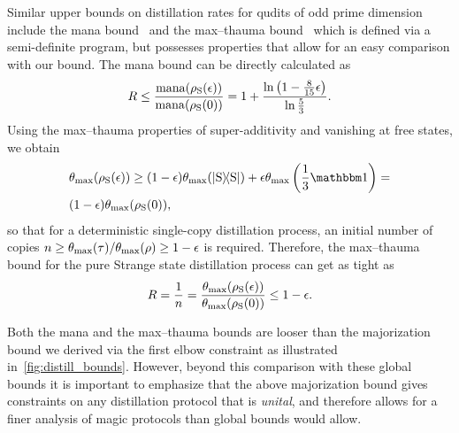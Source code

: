 \documentclass[pra,
aps,
twocolumn,
superscriptaddress,
groupedaddress,
nofootinbib,
reprint
]{revtex4-1}
\begin{document}
Similar upper bounds on distillation rates for qudits of odd prime dimension include the mana bound~\cite{cit:veitch} and the max--thauma bound~\cite{Wang_2020} which is defined via a semi-definite program, but possesses properties that allow for an easy comparison with our bound.
The mana bound can be directly calculated as
\begin{equation}
	R \leq \frac{{{\rm{mana}}(\rho_{\rm{S}}(\epsilon))}}{{{\rm{mana}}(\rho_{\rm{S}}(0))}} = 1 + \frac{\ln \left(1 - \frac{8}{15}\epsilon \right)}{\ln \frac{5}{3}}.
\end{equation}
Using the max--thauma properties of super-additivity and vanishing at free states, we obtain
\begin{align}
	&\theta_{\rm{max}}(\rho_{\rm{S}}(\epsilon)) \geq (1-\epsilon) \theta_{\rm{max}}(\ketbra{\rm{S}}) + \epsilon \theta_{\rm{max}}\left(\frac{1}{3}\id \right) = \nonumber\\
	&(1-\epsilon) \theta_{\rm{max}}(\rho_{\rm{S}}(0)),
\end{align}
so that for a deterministic single-copy distillation process, an initial number of copies $n \geq \theta_{\rm{max}}(\tau) / \theta_{\rm{max}}(\rho) \geq 1-\epsilon$ is required.
Therefore, the max--thauma bound for the pure Strange state distillation process can get as tight as
\begin{equation}
	R = \frac{1}{n} = \frac{\theta_{\rm{max}}(\rho_{\rm{S}}(\epsilon))}{\theta_{\rm{max}}(\rho_{\rm{S}}(0))} \leq 1-\epsilon.
\end{equation}

Both the mana and the max--thauma bounds are looser than the majorization bound we derived via the first elbow constraint as illustrated in~\cref{fig:distill_bounds}. However, beyond this comparison with these global bounds it is important to emphasize that the above majorization bound gives constraints on any distillation protocol that is \emph{unital}, and therefore allows for a finer analysis of magic protocols than global bounds would allow.
\end{document}
